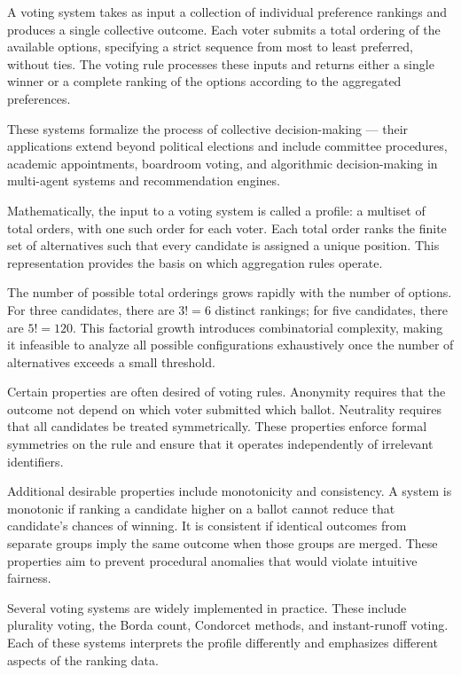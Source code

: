 A voting system takes as input a collection of individual preference rankings and produces a single collective outcome. Each voter submits a total ordering of the available options, specifying a strict sequence from most to least preferred, without ties. The voting rule processes these inputs and returns either a single winner or a complete ranking of the options according to the aggregated preferences.

These systems formalize the process of collective decision-making — their applications extend beyond political elections and include committee procedures, academic appointments, boardroom voting, and algorithmic decision-making in multi-agent systems and recommendation engines.

Mathematically, the input to a voting system is called a profile: a multiset of total orders, with one such order for each voter. Each total order ranks the finite set of alternatives such that every candidate is assigned a unique position. This representation provides the basis on which aggregation rules operate.

The number of possible total orderings grows rapidly with the number of options. For three candidates, there are $3! = 6$ distinct rankings; for five candidates, there are $5! = 120$. This factorial growth introduces combinatorial complexity, making it infeasible to analyze all possible configurations exhaustively once the number of alternatives exceeds a small threshold.

Certain properties are often desired of voting rules. Anonymity requires that the outcome not depend on which voter submitted which ballot. Neutrality requires that all candidates be treated symmetrically. These properties enforce formal symmetries on the rule and ensure that it operates independently of irrelevant identifiers.

Additional desirable properties include monotonicity and consistency. A system is monotonic if ranking a candidate higher on a ballot cannot reduce that candidate’s chances of winning. It is consistent if identical outcomes from separate groups imply the same outcome when those groups are merged. These properties aim to prevent procedural anomalies that would violate intuitive fairness.

Several voting systems are widely implemented in practice. These include plurality voting, the Borda count, Condorcet methods, and instant-runoff voting. Each of these systems interprets the profile differently and emphasizes different aspects of the ranking data.

